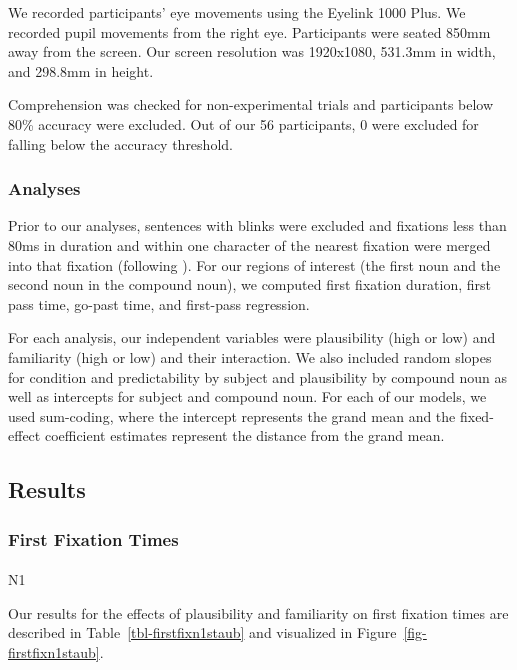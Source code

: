 \documentclass[
  12pt,
  letterpaper,
]{scrreprt}
\makeatletter
\let\oldparagraph\paragraph
\renewcommand{\paragraph}{
    \@ifstar
      \xxxParagraphStar
      \xxxParagraphNoStar
  }
\newcommand{\xxxParagraphStar}[1]{\oldparagraph*{#1}\mbox{}}
\newcommand{\xxxParagraphNoStar}[1]{\oldparagraph{#1}\mbox{}}
\makeatother
\begin{document}
We recorded participants' eye movements using the Eyelink 1000 Plus. We
recorded pupil movements from the right eye. Participants were seated
850mm away from the screen. Our screen resolution was 1920x1080, 531.3mm
in width, and 298.8mm in height.

Comprehension was checked for non-experimental trials and participants
below 80\% accuracy were excluded. Out of our 56 participants, 0 were
excluded for falling below the accuracy threshold.

\subsubsection{Analyses}\label{analyses}

Prior to our analyses, sentences with blinks were excluded and fixations
less than 80ms in duration and within one character of the nearest
fixation were merged into that fixation (following
). For
our regions of interest (the first noun and the second noun in the
compound noun), we computed first fixation duration, first pass time,
go-past time, and first-pass regression.

For each analysis, our independent variables were plausibility (high or
low) and familiarity (high or low) and their interaction. We also
included random slopes for condition and predictability by subject and
plausibility by compound noun as well as intercepts for subject and
compound noun. For each of our models, we used sum-coding, where the
intercept represents the grand mean and the fixed-effect coefficient
estimates represent the distance from the grand mean.

\subsection{Results}\label{results-2}

\subsubsection{First Fixation Times}\label{first-fixation-times}

\paragraph{N1}\label{n1}

Our results for the effects of plausibility and familiarity on first
fixation times are described in Table~\ref{tbl-firstfixn1staub} and
visualized in Figure~\ref{fig-firstfixn1staub}.
\end{document}

